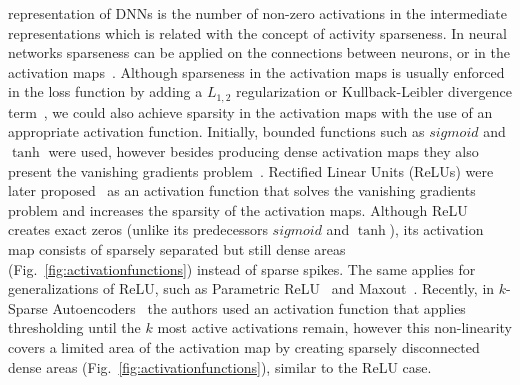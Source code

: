 \documentclass[journal]{IEEEtran}
\begin{document}
representation of DNNs is the number of non-zero activations in the
intermediate representations which is related with the concept of
activity sparseness.
In neural networks sparseness can be applied on the connections
between neurons, or in the activation maps~\cite{laughlin2003communication}.
Although sparseness in the activation maps is usually enforced in the
loss function by adding a $L_{1, 2}$ regularization or
Kullback-Leibler divergence term~\cite{kingma2013auto}, we could also
achieve sparsity in the activation maps with the use of an
appropriate activation function.
Initially, bounded functions such as $sigmoid$ and $\tanh$ were used,
however besides producing dense activation maps they also present the
vanishing gradients problem~\cite{bengio1994learning}.
Rectified Linear Units (ReLUs) were later
proposed~\cite{glorot2011deep, nair2010rectified} as an activation
function that solves the vanishing gradients problem and increases
the sparsity of the activation maps.
Although ReLU creates exact zeros (unlike its predecessors $sigmoid$
and $\tanh$), its activation map consists of sparsely separated but
still dense areas
(Fig.~\ref{fig:activationfunctions}) instead of
sparse spikes.
The same applies for generalizations of ReLU, such as Parametric
ReLU~\cite{he2015delving} and Maxout~\cite{goodfellow2013maxout}.
Recently, in $k$-Sparse Autoencoders~\cite{makhzani2013k} the authors
used an activation function that applies thresholding until the $k$
most active activations remain, however this non-linearity covers a
limited area of the activation map by creating sparsely disconnected
dense areas
(Fig.~\ref{fig:activationfunctions}),
similar to the ReLU case.
\end{document}
